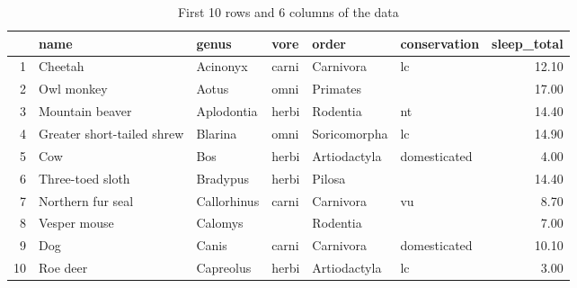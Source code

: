 \begin{table}[H]
\centering
\footnotesize
\ttfamily
\begin{tabular}{rlllllr}
  \hline
 & name & genus & vore & order & conservation & sleep\_total \\ 
  \hline
1 & Cheetah & Acinonyx & carni & Carnivora & lc & 12.10 \\ 
  2 & Owl monkey & Aotus & omni & Primates &  & 17.00 \\ 
  3 & Mountain beaver & Aplodontia & herbi & Rodentia & nt & 14.40 \\ 
  4 & Greater short-tailed shrew & Blarina & omni & Soricomorpha & lc & 14.90 \\ 
  5 & Cow & Bos & herbi & Artiodactyla & domesticated & 4.00 \\ 
  6 & Three-toed sloth & Bradypus & herbi & Pilosa &  & 14.40 \\ 
  7 & Northern fur seal & Callorhinus & carni & Carnivora & vu & 8.70 \\ 
  8 & Vesper mouse & Calomys &  & Rodentia &  & 7.00 \\ 
  9 & Dog & Canis & carni & Carnivora & domesticated & 10.10 \\ 
  10 & Roe deer & Capreolus & herbi & Artiodactyla & lc & 3.00 \\ 
   \hline
\end{tabular}
\rmfamily
\caption{First 10 rows and 6 columns of the  data}
\label{table:msleep}
\end{table}